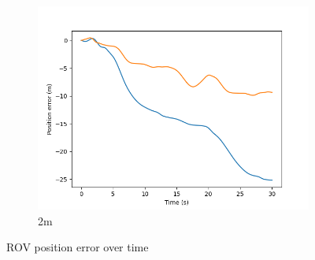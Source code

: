 \documentclass[class=article, crop=false]{standalone}
\begin{document}
\begin{figure}
\begin{subfigure}[b]{0.48\textwidth}
        \includegraphics{scenario1/rov-50m/2.0m/rov_position_error_uncontrolled}
        \caption{2m}
        \label{}
    \end{subfigure}

    \caption{ROV position error over time}
\end{figure}
\end{document}
